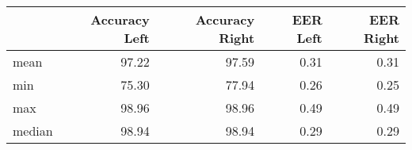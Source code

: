 \begin{tabular}{lrrrr}
\toprule
{} &  Accuracy Left &  Accuracy Right &  EER Left &  EER Right \\
\midrule
mean   &          97.22 &           97.59 &      0.31 &       0.31 \\
min    &          75.30 &           77.94 &      0.26 &       0.25 \\
max    &          98.96 &           98.96 &      0.49 &       0.49 \\
median &          98.94 &           98.94 &      0.29 &       0.29 \\
\bottomrule
\end{tabular}
